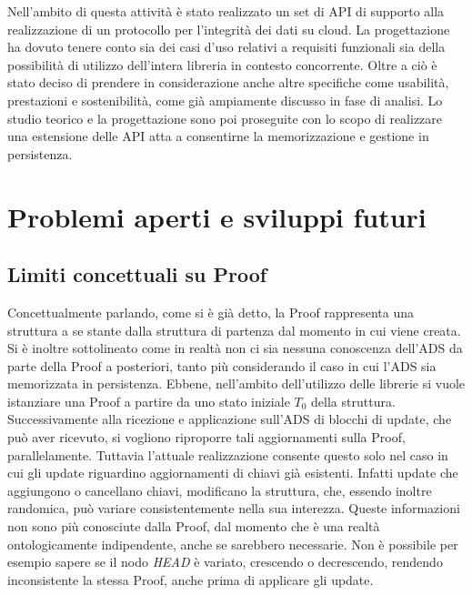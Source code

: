 
	Nell'ambito di questa attività è stato realizzato un set di API di supporto alla realizzazione di un protocollo per l'integrità dei dati su cloud. La progettazione ha dovuto tenere conto sia dei casi d'uso relativi a requisiti funzionali sia della possibilità di utilizzo dell'intera libreria in contesto concorrente. Oltre a ciò è stato deciso di prendere in considerazione anche altre specifiche come usabilità, prestazioni e sostenibilità, come già ampiamente discusso in fase di analisi. Lo studio teorico e la progettazione sono poi proseguite con lo scopo di realizzare una estensione delle API atta a consentirne la memorizzazione e gestione in persistenza.

\section{Problemi aperti e sviluppi futuri}

	\subsection{Limiti concettuali su Proof}
	

		Concettualmente parlando, come si è già detto, la Proof rappresenta una struttura a se stante dalla struttura di partenza dal momento in cui viene creata. Si è inoltre sottolineato come in realtà non ci sia nessuna conoscenza dell'ADS da parte della Proof a posteriori, tanto più considerando il caso in cui l'ADS sia memorizzata in persistenza.
		Ebbene, nell'ambito dell'utilizzo delle librerie si vuole istanziare una Proof a partire da uno stato iniziale $ T_{0} $ della struttura. Successivamente alla ricezione e applicazione sull'ADS di blocchi di update, che può aver ricevuto, si vogliono riproporre tali aggiornamenti sulla Proof, parallelamente. Tuttavia l'attuale realizzazione consente questo solo nel caso in cui gli update riguardino aggiornamenti di chiavi già esistenti. Infatti update che aggiungono o cancellano chiavi, modificano la struttura, che, essendo inoltre randomica, può variare consistentemente nella sua interezza. Queste informazioni non sono più conosciute dalla Proof, dal momento che è una realtà ontologicamente indipendente, anche se sarebbero necessarie. Non è possibile per esempio sapere se il nodo \textit{HEAD} è variato, crescendo o decrescendo, rendendo inconsistente la stessa Proof, anche prima di applicare gli update.
	
